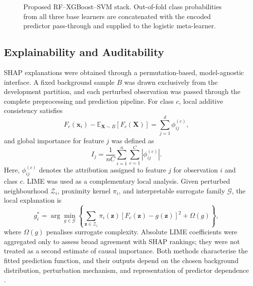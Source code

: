 \documentclass{elektr}
\begin{document}
\begin{figure}[H]
\centering
{}
\caption{Proposed RF--XGBoost--SVM stack. Out-of-fold class probabilities from all three base learners are concatenated with the encoded predictor pass-through and supplied to the logistic meta-learner.}
\label{fig:stack}
\end{figure}

\subsection{Explainability and Auditability}
SHAP explanations were obtained through a permutation-based, model-agnostic interface. A fixed background sample $B$ was drawn exclusively from the development partition, and each perturbed observation was passed through the complete preprocessing and prediction pipeline. For class $c$, local additive consistency satisfies
\begin{equation}
F_c(\mathbf{x}_i)-\mathbb{E}_{\mathbf{X}\sim B}[F_c(\mathbf{X})]
=\sum_{j=1}^{d}\phi_{ij}^{(c)},
\label{eq:shaplocal}
\end{equation}
and global importance for feature $j$ was defined as
\begin{equation}
I_j=\frac{1}{nC}\sum_{i=1}^{n}\sum_{c=1}^{C}|\phi_{ij}^{(c)}|.
\label{eq:shapglobal}
\end{equation}
Here, $\phi_{ij}^{(c)}$ denotes the attribution assigned to feature $j$ for observation $i$ and class $c$. LIME was used as a complementary local analysis. Given perturbed neighbourhood $\mathcal{Z}_i$, proximity kernel $\pi_i$, and interpretable surrogate family $\mathcal{G}$, the local explanation is
\begin{equation}
g_i^{*}=\arg\min_{g\in\mathcal{G}}
\left\{\sum_{\mathbf{z}\in\mathcal{Z}_i}\pi_i(\mathbf{z})
[F_c(\mathbf{z})-g(\mathbf{z})]^2+\Omega(g)\right\},
\label{eq:lime}
\end{equation}
where $\Omega(g)$ penalises surrogate complexity. Absolute LIME coefficients were aggregated only to assess broad agreement with SHAP rankings; they were not treated as a second estimate of causal importance. Both methods characterise the fitted prediction function, and their outputs depend on the chosen background distribution, perturbation mechanism, and representation of predictor dependence \cite{instanceshap2023,jung2023}.
\end{document}
